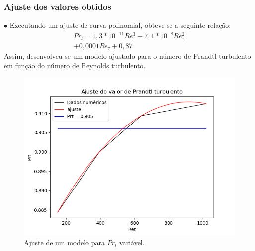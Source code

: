\documentclass[xcolor=dvipsnames,10pt,aspectratio=169]{beamer}
\begin{document}
	
	
	
		\begin{frame}
		\frametitle{Ajuste dos valores obtidos}
		\begin{minipage}[h!]{0.45\textwidth}
			$\bullet$ Executando um ajuste de curva polinomial, obteve-se a seguinte relação:
			\begin{equation}
			\begin{split}
			Pr_t = 1,3 * 10^{-11} Re_\tau^3 - 7,1 * 10^{-8} Re_\tau^2 \\ + 0,0001 Re_\tau + 0,87 
			\end{split}
			\end{equation}
			Assim, desenvolveu-se um modelo ajustado para o número de Prandtl turbulento em função do número de Reynolds turbulento.
		\end{minipage}\hfill
		\begin{minipage}[h!]{0.45\textwidth}
			\begin{figure}
				\centering
				\includegraphics[angle=0, scale=0.41]{ajustePrandtl}
				\caption{Ajuste de um modelo para $Pr_t$ variável.}
			\end{figure}
		\end{minipage}\\
		\end{frame}	
		
		
		
	
	
\end{document}
